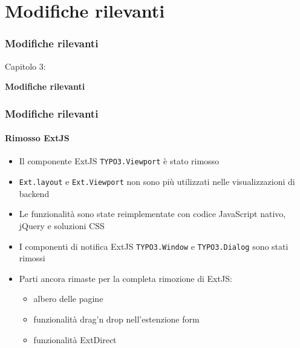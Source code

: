 %

\section{Modifiche rilevanti}
\begin{frame}[fragile]
	\frametitle{Modifiche rilevanti}

	\begin{center}\huge{Capitolo 3:}\end{center}
	\begin{center}\huge{\color{typo3darkgrey}\textbf{Modifiche rilevanti}}\end{center}

\end{frame}


\begin{frame}[fragile]
	\frametitle{Modifiche rilevanti}
	\framesubtitle{Rimosso ExtJS}

	\begin{itemize}
		\item Il componente ExtJS \texttt{TYPO3.Viewport} è stato rimosso
		\item \texttt{Ext.layout} e \texttt{Ext.Viewport} non sono più utilizzati nelle visualizzazioni di backend
		\item Le funzionalità sono state reimplementate con codice JavaScript nativo, jQuery e soluzioni CSS
		\item I componenti di notifica ExtJS \texttt{TYPO3.Window} e \texttt{TYPO3.Dialog} sono stati rimossi
		\item Parti ancora rimaste per la completa rimozione di ExtJS:

		\begin{itemize}
			\item albero delle pagine
			\item funzionalità drag'n drop nell'estenzione form
			\item funzionalità ExtDirect
		\end{itemize}

	\end{itemize}

\end{frame}


